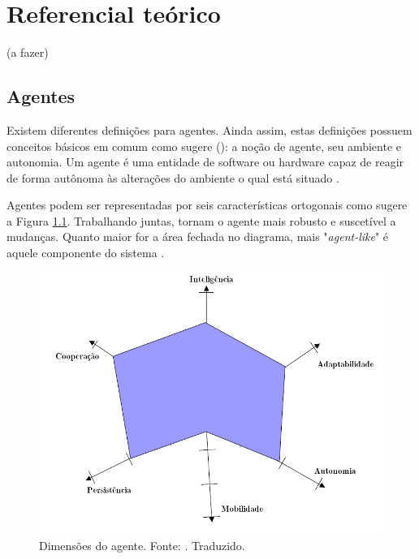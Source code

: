 \chapter[Referencial teórico]{Referencial teórico}\label{ch:referencial}

(a fazer)


\section{Agentes}

Existem diferentes definições para agentes. Ainda assim, estas definições possuem conceitos básicos em comum como sugere \citeauthor{mcarthur2007multi} (\citeyear{mcarthur2007multi}): a noção de agente, seu ambiente e autonomia. Um agente é uma entidade de software ou hardware capaz de reagir de forma autônoma às alterações do ambiente o qual está situado .


Agentes podem ser representadas por seis características ortogonais como sugere a Figura \ref{fig:hexagono}. Trabalhando juntas, tornam o agente mais robusto e suscetível a mudanças. Quanto maior for a área fechada no diagrama, mais "\textit{agent-like}" é aquele componente do sistema \cite{griss2001software}.

\begin{figure}[h!]
    \includegraphics[scale=0.7]{figuras/hexagono_agente}
    \centering
    \caption{Dimensões do agente. Fonte: \cite{griss2001software}. Traduzido.}
    \label{fig:hexagono}
\end{figure}

